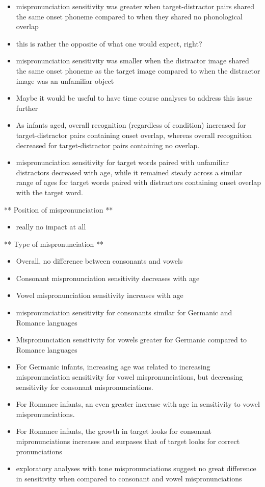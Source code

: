 \documentclass[man]{apa6}
\providecommand{\tightlist}{%
  \setlength{\itemsep}{0pt}\setlength{\parskip}{0pt}}
\theoremstyle{definition}
\theoremstyle{definition}
\theoremstyle{definition}
\theoremstyle{remark}
\begin{document}
\begin{itemize}
\tightlist
\item
  mispronunciation sensitivity was greater when target-distractor pairs
  shared the same onset phoneme compared to when they shared no
  phonological overlap
\item
  this is rather the opposite of what one would expect, right?
\item
  mispronunciation sensitivity was smaller when the distractor image
  shared the same onset phoneme as the target image compared to when the
  distractor image was an unfamiliar object
\item
  Maybe it would be useful to have time course analyses to address this
  issue further
\item
  As infants aged, overall recognition (regardless of condition)
  increased for target-distractor pairs containing onset overlap,
  whereas overall recognition decreased for target-distractor pairs
  containing no overlap.
\item
  mispronunciation sensitivity for target words paired with unfamiliar
  distractors decreased with age, while it remained steady across a
  similar range of ages for target words paired with distractors
  containing onset overlap with the target word.
\end{itemize}

** Position of mispronunciation **

\begin{itemize}
\tightlist
\item
  really no impact at all
\end{itemize}

** Type of mispronunciation **

\begin{itemize}
\tightlist
\item
  Overall, no difference between consonants and vowels
\item
  Consonant mispronunciation sensitivity decreases with age
\item
  Vowel mispronunciation sensitivity increases with age
\item
  mispronunciation sensitivity for consonants similar for Germanic and
  Romance languages
\item
  Mispronunciation sensitivity for vowels greater for Germanic compared
  to Romance languages
\item
  For Germanic infants, increasing age was related to increasing
  mispronunciation sensitivity for vowel mispronunciations, but
  decreasing sensitivity for consonant mispronunciations.
\item
  For Romance infants, an even greater increase with age in sensitivity
  to vowel mispronunciations.
\item
  For Romance infants, the growth in target looks for consonant
  mipronunciations increases and surpases that of target looks for
  correct pronunciations
\item
  exploratory analyses with tone mispronunciations suggest no great
  difference in sensitivity when compared to consonant and vowel
  mispronunciations
\end{itemize}
\end{document}
